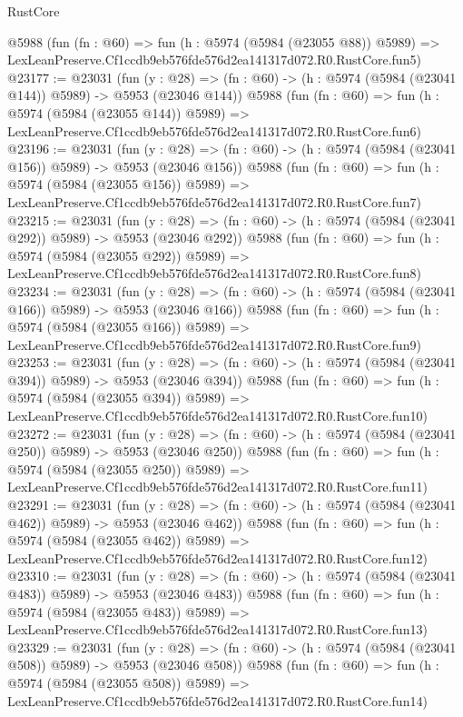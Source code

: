 \begin{lexlean}{RustCore}
\begin{coremodule}
    @5988
    (fun (fn : @60) =>
    fun (h : @5974 (@5984 (@23055 @88)) @5989) =>
    LexLeanPreserve.Cf1ccdb9eb576fde576d2ea141317d072.R0.RustCore.fun5)
@23177 := @23031
    (fun (y : @28) => (fn : @60) -> (h : @5974 (@5984 (@23041 @144)) @5989) -> @5953 (@23046 @144))
    @5988
    (fun (fn : @60) =>
    fun (h : @5974 (@5984 (@23055 @144)) @5989) =>
    LexLeanPreserve.Cf1ccdb9eb576fde576d2ea141317d072.R0.RustCore.fun6)
@23196 := @23031
    (fun (y : @28) => (fn : @60) -> (h : @5974 (@5984 (@23041 @156)) @5989) -> @5953 (@23046 @156))
    @5988
    (fun (fn : @60) =>
    fun (h : @5974 (@5984 (@23055 @156)) @5989) =>
    LexLeanPreserve.Cf1ccdb9eb576fde576d2ea141317d072.R0.RustCore.fun7)
@23215 := @23031
    (fun (y : @28) => (fn : @60) -> (h : @5974 (@5984 (@23041 @292)) @5989) -> @5953 (@23046 @292))
    @5988
    (fun (fn : @60) =>
    fun (h : @5974 (@5984 (@23055 @292)) @5989) =>
    LexLeanPreserve.Cf1ccdb9eb576fde576d2ea141317d072.R0.RustCore.fun8)
@23234 := @23031
    (fun (y : @28) => (fn : @60) -> (h : @5974 (@5984 (@23041 @166)) @5989) -> @5953 (@23046 @166))
    @5988
    (fun (fn : @60) =>
    fun (h : @5974 (@5984 (@23055 @166)) @5989) =>
    LexLeanPreserve.Cf1ccdb9eb576fde576d2ea141317d072.R0.RustCore.fun9)
@23253 := @23031
    (fun (y : @28) => (fn : @60) -> (h : @5974 (@5984 (@23041 @394)) @5989) -> @5953 (@23046 @394))
    @5988
    (fun (fn : @60) =>
    fun (h : @5974 (@5984 (@23055 @394)) @5989) =>
    LexLeanPreserve.Cf1ccdb9eb576fde576d2ea141317d072.R0.RustCore.fun10)
@23272 := @23031
    (fun (y : @28) => (fn : @60) -> (h : @5974 (@5984 (@23041 @250)) @5989) -> @5953 (@23046 @250))
    @5988
    (fun (fn : @60) =>
    fun (h : @5974 (@5984 (@23055 @250)) @5989) =>
    LexLeanPreserve.Cf1ccdb9eb576fde576d2ea141317d072.R0.RustCore.fun11)
@23291 := @23031
    (fun (y : @28) => (fn : @60) -> (h : @5974 (@5984 (@23041 @462)) @5989) -> @5953 (@23046 @462))
    @5988
    (fun (fn : @60) =>
    fun (h : @5974 (@5984 (@23055 @462)) @5989) =>
    LexLeanPreserve.Cf1ccdb9eb576fde576d2ea141317d072.R0.RustCore.fun12)
@23310 := @23031
    (fun (y : @28) => (fn : @60) -> (h : @5974 (@5984 (@23041 @483)) @5989) -> @5953 (@23046 @483))
    @5988
    (fun (fn : @60) =>
    fun (h : @5974 (@5984 (@23055 @483)) @5989) =>
    LexLeanPreserve.Cf1ccdb9eb576fde576d2ea141317d072.R0.RustCore.fun13)
@23329 := @23031
    (fun (y : @28) => (fn : @60) -> (h : @5974 (@5984 (@23041 @508)) @5989) -> @5953 (@23046 @508))
    @5988
    (fun (fn : @60) =>
    fun (h : @5974 (@5984 (@23055 @508)) @5989) =>
    LexLeanPreserve.Cf1ccdb9eb576fde576d2ea141317d072.R0.RustCore.fun14)

\end{coremodule}
\end{lexlean}
